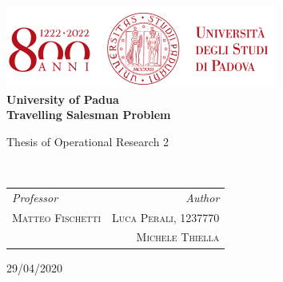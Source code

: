 \documentclass[10pt,swedish, openany]{book}
\begin{document}

	\begin{titlepage}
		\clearpage\thispagestyle{empty}
		\centering
		\vspace{2cm}

    \includegraphics[scale=0.75]{uniLogo.png} \\ [1cm]
  	\Large{ \textbf{University of Padua} } \\ [4cm]
		{\Huge \textbf{Travelling Salesman Problem}} \\ [1cm]
		{\large Thesis of Operational Research 2 \par} \\ [4cm]
    \begin{table}[h]
      \begin{tabularx}{\textwidth}{X r}

          \large\textit{Professor}  & \large\textit{Author} \\ [0.2cm]
          \large\textsc{Matteo Fischetti}  & \large\textsc{Luca Perali, 1237770} \\ [0.2cm]
            & \large\textsc{Michele Thiella } \\ [0.2cm]
          \hline
      \end{tabularx}
    \end{table}
		\vspace{2cm}

		{\normalsize 29/04/2020 \par}
		\vspace{2cm}

		\pagebreak

	\end{titlepage}

	\tableofcontents{}

	\clearpage

\end{document}
